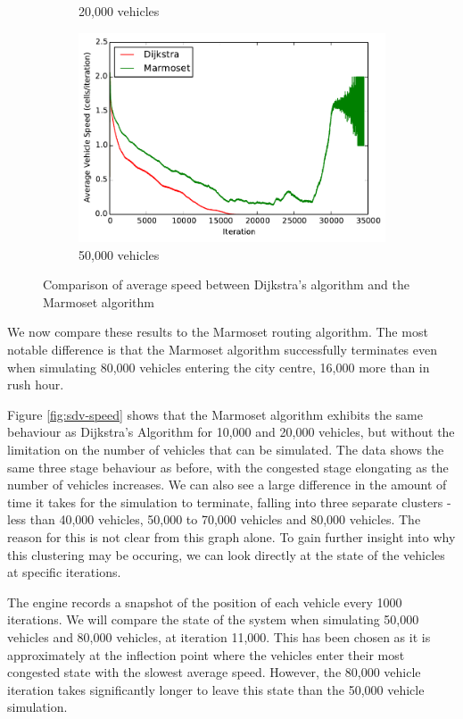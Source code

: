 \documentclass[ %
                    author={Alexander Hill},
                supervisor={Dr. Benjamin Sach},
                    degree={MEng},
                     title={MARMOSET},
                  subtitle={Multi-Agent Route Management using Online Simulation for Efficient Transportation},
                      type={research},
                      year={2016} ]{dissertation}
\begin{document}
\begin{figure}[p]
\begin{subfigure}[b]{0.3\textwidth}
        \caption{20,000 vehicles}
    \end{subfigure}
    \begin{subfigure}[b]{0.3\textwidth}
        \centering
        \includegraphics[width=\textwidth]{sdv-dij-comp-50k}
        \caption{50,000 vehicles}
    \end{subfigure}
    \caption{Comparison of average speed between Dijkstra's algorithm and the Marmoset algorithm}\label{fig:sdv-dij-comp}
\end{figure}

We now compare these results to the Marmoset routing algorithm. The most notable
difference is that the Marmoset algorithm successfully terminates even when
simulating 80,000 vehicles entering the city centre, 16,000 more than in rush
hour.

Figure \ref{fig:sdv-speed} shows that the Marmoset algorithm exhibits the same
behaviour as Dijkstra's Algorithm for 10,000 and 20,000 vehicles, but without
the limitation on the number of vehicles that can be simulated. The data shows
the same three stage behaviour as before, with the congested stage elongating as
the number of vehicles increases. We can also see a large difference in the
amount of time it takes for the simulation to terminate, falling into three
separate clusters - less than 40,000 vehicles, 50,000 to 70,000 vehicles and
80,000 vehicles. The reason for this is not clear from this graph alone. To gain
further insight into why this clustering may be occuring, we can look directly
at the state of the vehicles at specific iterations.

The engine records a snapshot of the position of each vehicle every 1000
iterations. We will compare the state of the system when simulating 50,000
vehicles and 80,000 vehicles, at iteration 11,000. This has been chosen as it is
approximately at the inflection point where the vehicles enter their most
congested state with the slowest average speed. However, the 80,000 vehicle
iteration takes significantly longer to leave this state than the 50,000 vehicle
simulation.
\end{document}

